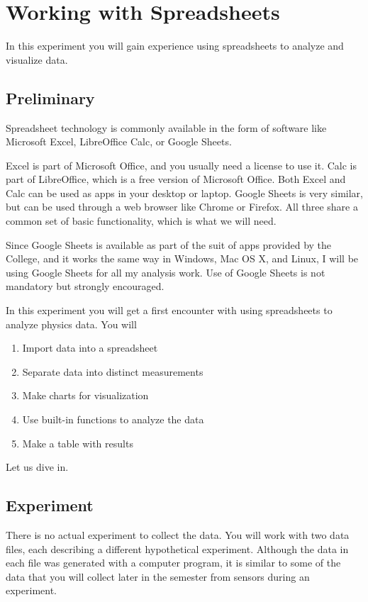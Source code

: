 \chapter{Working with Spreadsheets}
In this experiment you will gain experience using spreadsheets to analyze and visualize data.
\section{Preliminary}
Spreadsheet technology is commonly available in the form of software like Microsoft Excel, LibreOffice Calc, or Google Sheets.

Excel is part of Microsoft Office, and you usually need a license to use it. Calc is part of LibreOffice, which is a free version of Microsoft Office. Both Excel and Calc can be used as apps in your desktop or laptop. Google Sheets is very similar, but can be used through a web browser like Chrome or Firefox. All three share a common set of basic functionality, which is what we will need.

Since Google Sheets is available as part of the suit of apps provided by the College, and it works the same way in Windows, Mac OS X, and Linux, I will be using Google Sheets for all my analysis work. Use of Google Sheets is not mandatory but strongly encouraged.

In this experiment you will get a first encounter with using spreadsheets to analyze physics data. You will
\begin{enumerate}
    \item Import data into a spreadsheet
    \item Separate data into distinct measurements
    \item Make charts for visualization
    \item Use built-in functions to analyze the data
    \item Make a table with results
\end{enumerate}
Let us dive in.
\section{Experiment}
There is no actual experiment to collect the data. You will work with two data files, each describing a different hypothetical experiment. Although the data in each file was generated with a computer program, it is similar to some of the data that you will collect later in the semester from sensors during an experiment.
